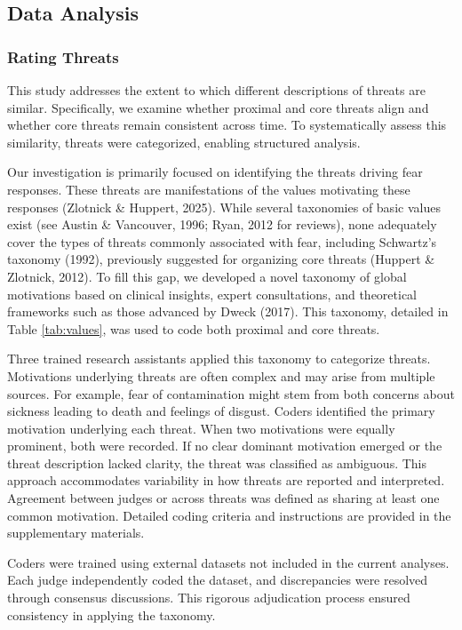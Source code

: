 \documentclass[
  man,floatsintext]{apa7}
\begin{document}
\subsection{Data Analysis}\label{data-analysis}

\subsubsection{Rating Threats}\label{rating-threats}

This study addresses the extent to which different descriptions of threats are similar.
Specifically, we examine whether proximal and core threats align and whether core threats remain consistent across time.
To systematically assess this similarity, threats were categorized, enabling structured analysis.

Our investigation is primarily focused on identifying the threats driving fear responses.
These threats are manifestations of the values motivating these responses (Zlotnick \& Huppert, 2025).
While several taxonomies of basic values exist (see Austin \& Vancouver, 1996; Ryan, 2012 for reviews), none adequately cover the types of threats commonly associated with fear, including Schwartz's taxonomy (1992), previously suggested for organizing core threats (Huppert \& Zlotnick, 2012).
To fill this gap, we developed a novel taxonomy of global motivations based on clinical insights, expert consultations, and theoretical frameworks such as those advanced by Dweck (2017).
This taxonomy, detailed in Table \ref{tab:values}, was used to code both proximal and core threats.

Three trained research assistants applied this taxonomy to categorize threats.
Motivations underlying threats are often complex and may arise from multiple sources.
For example, fear of contamination might stem from both concerns about sickness leading to death and feelings of disgust.
Coders identified the primary motivation underlying each threat.
When two motivations were equally prominent, both were recorded.
If no clear dominant motivation emerged or the threat description lacked clarity, the threat was classified as ambiguous.
This approach accommodates variability in how threats are reported and interpreted.
Agreement between judges or across threats was defined as sharing at least one common motivation.
Detailed coding criteria and instructions are provided in the supplementary materials.

Coders were trained using external datasets not included in the current analyses.
Each judge independently coded the dataset, and discrepancies were resolved through consensus discussions.
This rigorous adjudication process ensured consistency in applying the taxonomy.
\end{document}
